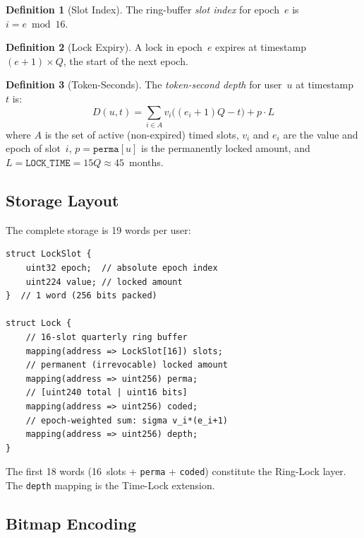\documentclass[10pt,a4paper,twocolumn]{article}
\theoremstyle{definition}
\newtheorem{definition}{Definition}[section]
\theoremstyle{plain}
\theoremstyle{remark}
\begin{document}
\begin{definition}[Slot Index]
\label{def:slot-index}
The ring-buffer \emph{slot index} for epoch~$e$ is $i = e \bmod 16$.
\end{definition}

\begin{definition}[Lock Expiry]
\label{def:lock-expiry}
A lock in epoch~$e$ expires at timestamp $(e{+}1) \times Q$, the start of the next epoch.
\end{definition}

\begin{definition}[Token-Seconds]
\label{def:token-seconds}
The \emph{token-second depth} for user~$u$ at timestamp~$t$ is:
\begin{equation}
\label{eq:token-seconds}
D(u,t) = \sum_{i \in A} v_i \bigl((e_i{+}1)Q - t\bigr) + p \cdot L
\end{equation}
where $A$ is the set of active (non-expired) timed slots, $v_i$ and $e_i$ are the value and epoch of slot~$i$, $p = \texttt{perma}[u]$ is the permanently locked amount, and $L = \texttt{LOCK\_TIME} = 15Q \approx 45$~months.
\end{definition}

\subsection{Storage Layout}
\label{subsec:storage-layout}

The complete storage is 19 words per user:

\begin{lstlisting}[language=Solidity, caption={Lock storage layout}, label={lst:lock-struct}]
struct LockSlot {
    uint32 epoch;  // absolute epoch index
    uint224 value; // locked amount
}  // 1 word (256 bits packed)

struct Lock {
    // 16-slot quarterly ring buffer
    mapping(address => LockSlot[16]) slots;
    // permanent (irrevocable) locked amount
    mapping(address => uint256) perma;
    // [uint240 total | uint16 bits]
    mapping(address => uint256) coded;
    // epoch-weighted sum: sigma v_i*(e_i+1)
    mapping(address => uint256) depth;
}
\end{lstlisting}

The first 18 words (16~slots + \texttt{perma} + \texttt{coded}) constitute the Ring-Lock layer. The \texttt{depth} mapping is the Time-Lock extension.

\subsection{Bitmap Encoding}
\label{subsec:bitmap}
\end{document}
